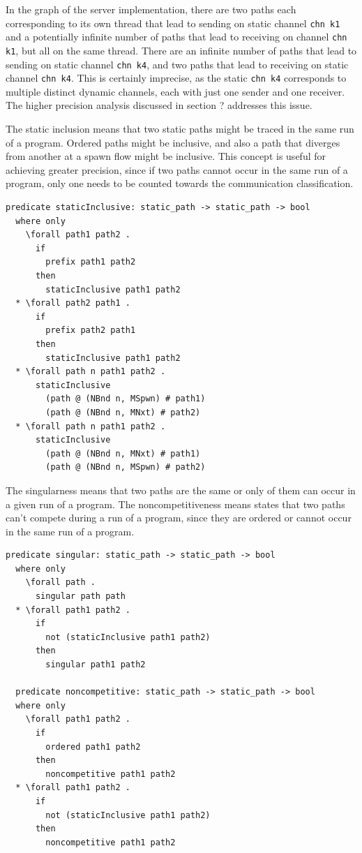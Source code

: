 \documentclass[letterpaper, 11pt]{extarticle}
\begin{document}
In the graph of the server implementation, there are two paths each corresponding to its
own thread that lead
to sending on
static channel \lstinline[language=sugar_lang]{chn k1} and a potentially infinite number of
paths that lead to receiving on
channel \lstinline[language=sugar_lang]{chn k1}, but all on the same thread.
There are an infinite number of paths that lead
to sending on static channel \lstinline[language=sugar_lang]{chn k4}, and two paths
that lead to receiving on static channel
\lstinline[language=sugar_lang]{chn k4}. This is certainly imprecise,
as the static \lstinline[language=sugar_lang]{chn k4} corresponds to
multiple distinct dynamic channels, each with just one sender and one receiver.  The higher
precision analysis discussed in section ? addresses this issue.

The static inclusion means that two static paths might be traced in
the same run of a program. Ordered paths might be inclusive, and also a path that diverges
from another at a spawn flow might be inclusive. This concept is useful for achieving
greater precision, since if two paths cannot occur in the same run of a program, only one needs
to be counted towards the communication classification. 

\begin{lstlisting}[language=logic, mathescape]
  predicate staticInclusive: static_path -> static_path -> bool
  where only
    \forall path1 path2 .
      if
        prefix path1 path2
      then
        staticInclusive path1 path2
  * \forall path2 path1 .
      if
        prefix path2 path1
      then
        staticInclusive path1 path2
  * \forall path n path1 path2 .
      staticInclusive
        (path @ (NBnd n, MSpwn) # path1)
        (path @ (NBnd n, MNxt) # path2)
  * \forall path n path1 path2 .
      staticInclusive
        (path @ (NBnd n, MNxt) # path1)
        (path @ (NBnd n, MSpwn) # path2)
\end{lstlisting}

The singularness means that two paths are the same or only of them can occur in a given run of
a program. The noncompetitiveness means states that two paths can't compete during a run of a
program, since they are ordered or cannot occur in the same run of a program.

\begin{lstlisting}[language=logic, mathescape]
  predicate singular: static_path -> static_path -> bool
  where only
    \forall path .
      singular path path
  * \forall path1 path2 .
      if
        not (staticInclusive path1 path2)
      then
        singular path1 path2

  predicate noncompetitive: static_path -> static_path -> bool
  where only
    \forall path1 path2 .
      if
        ordered path1 path2
      then
        noncompetitive path1 path2
  * \forall path1 path2 .
      if
        not (staticInclusive path1 path2)
      then
        noncompetitive path1 path2
\end{lstlisting}
\end{document}
